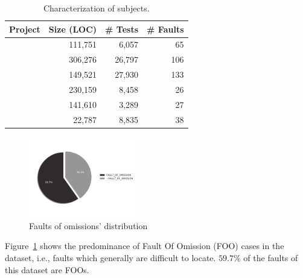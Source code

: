 \documentclass{article}
\begin{document}
\newcommand{\cgray}[1]{\cellcolor{gray!25}#1}
\begin{table}[h]
  \centering
  \setlength{\tabcolsep}{4pt}
    \begin{tabular}{lrrr}
      \toprule
     Project            & Size (LOC) & \# Tests & \# Faults \\ %
      \midrule
      \lang{}            & 111,751  & 6,057 & 65       \\   %
      \cmath{}           & 306,276  & 26,797 & 106     \\   %
      \closure{}         & 149,521  & 27,930  & 133     \\   %
      \chart{}           & 230,159  & 8,458 & 26      \\  %
      \jtime{}           & 141,610  & 3,289 & 27       \\   %
      \mockito{}         & 22,787  & 8,835 & 38    \\     %
      \bottomrule
  \end{tabular}
\caption {Characterization of \dfj{} subjects.}

\label{tab:df4j}
\end{table}
\normalsize

\begin{figure}[h]
	\vspace{-1.5cm}

		\centering
		\includegraphics[width=0.42\textwidth]{figures/defects4j.pdf}
		\vspace{-1cm}
		\caption{Faults of omissions' distribution}
		\label{fig:foos}
\end{figure}

Figure~\ref{fig:foos} shows the predominance of Fault Of Omission (FOO) cases in
the dataset, i.e., faults which generally are difficult to locate. $59.7\%$ of
the faults of this dataset are FOOs.
\end{document}
